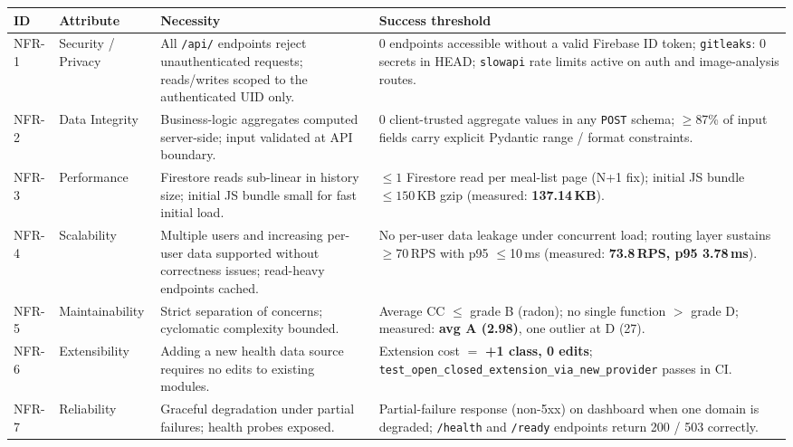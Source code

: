 \documentclass[11pt]{article}
\begin{document}
\begin{longtable}{p{1.2cm} p{2.5cm} p{4.8cm} p{5.0cm}}
  \toprule
  \textbf{ID} & \textbf{Attribute} & \textbf{Necessity} & \textbf{Success threshold} \\
  \midrule
  \endhead

  NFR-1 & Security / Privacy
        & All \texttt{/api/} endpoints reject unauthenticated requests;
          reads/writes scoped to the authenticated UID only.
        & 0 endpoints accessible without a valid Firebase ID token;
          \texttt{gitleaks}: 0 secrets in HEAD;
          \texttt{slowapi} rate limits active on auth and image-analysis routes. \\[2pt]

  NFR-2 & Data Integrity
        & Business-logic aggregates computed server-side; input validated at API boundary.
        & 0 client-trusted aggregate values in any \texttt{POST} schema;
          $\geq$87\% of input fields carry explicit Pydantic range / format constraints. \\[2pt]

  NFR-3 & Performance
        & Firestore reads sub-linear in history size;
          initial JS bundle small for fast initial load.
        & $\leq 1$ Firestore read per meal-list page (N+1 fix);
          initial JS bundle $\leq 150$\,KB gzip
          (measured: \textbf{137.14\,KB}). \\[2pt]

  NFR-4 & Scalability
        & Multiple users and increasing per-user data supported without correctness
          issues; read-heavy endpoints cached.
        & No per-user data leakage under concurrent load;
          routing layer sustains $\geq$70\,RPS with p95 $\leq$10\,ms
          (measured: \textbf{73.8\,RPS, p95 3.78\,ms}). \\[2pt]

  NFR-5 & Maintainability
        & Strict separation of concerns; cyclomatic complexity bounded.
        & Average CC $\leq$ grade B (radon);
          no single function $>$ grade D;
          measured: \textbf{avg A (2.98)}, one outlier at D (27). \\[2pt]

  NFR-6 & Extensibility
        & Adding a new health data source requires no edits to existing modules.
        & Extension cost $=$ \textbf{+1 class, 0 edits};
          \texttt{test\_open\_closed\_extension\_via\_new\_provider}
          passes in CI. \\[2pt]

  NFR-7 & Reliability
        & Graceful degradation under partial failures;
          health probes exposed.
        & Partial-failure response (non-5xx) on dashboard when one domain is
          degraded; \texttt{/health} and \texttt{/ready} endpoints return 200 / 503
          correctly. \\[2pt]


\end{longtable}
\end{document}
